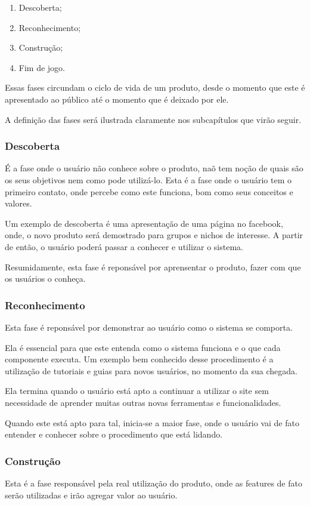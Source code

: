 \begin{enumerate}
    \item Descoberta;
    \item Reconhecimento;
    \item Construção;
    \item Fim de jogo.
\end{enumerate}

Essas fases circundam o ciclo de vida de um produto, desde o momento que este
é apresentado ao público até o momento que é deixado por ele.

A definição das fases será ilustrada claramente nos subcapítulos que virão seguir.

\subsubsection{Descoberta}
\label{sub:descoperta}
É a fase onde o usuário não conhece sobre o produto, naõ tem noção de quais são
os
seus objetivos nem como pode utilizá-lo. Esta é a fase onde o usuário tem o primeiro
contato, onde percebe como este funciona, bom como seus conceitos e valores.

Um exemplo de descoberta é uma apresentação de uma página no facebook, onde,
o novo produto será demostrado para grupos e nichos de interesse. A partir
de então, o usuário poderá passar a conhecer e utilizar o sistema.

Resumidamente, esta fase é reponsável por aprensentar o produto, fazer
com que os usuários o conheça.

\subsubsection{Reconhecimento}
\label{sub:reconhecimento}
Esta fase é reponsável por demonstrar ao usuário como o sistema se comporta.

Ela é essencial para que este entenda como o sistema funciona e o que cada
componente executa. Um exemplo bem conhecido desse procedimento é a utilização
de tutoriais e guias para novos usuários, no momento da sua chegada.

Ela termina quando o usuário está apto a continuar a utilizar o site sem
necessidade de aprender muitas outras novas ferramentas e funcionalidades.

Quando este está apto para tal, inicia-se a maior fase, onde o usuário
vai de fato entender e conhecer sobre o procedimento que está lidando.

\subsubsection{Construção}
\label{sub:constru_o}
Esta é a fase responsável pela real utilização do produto, onde as features
de fato serão utilizadas e irão agregar valor ao usuário.

